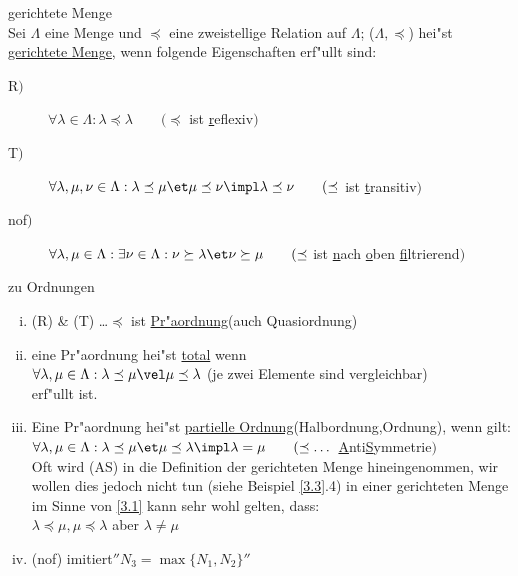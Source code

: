 \begin{definition}\label{3.1}gerichtete Menge\\
Sei $\Lambda$ eine Menge und $\preceq$ eine zweistellige Relation auf $\Lambda$; ($\Lambda ,\preceq $) hei"st \ul{gerichtete Menge}, wenn folgende Eigenschaften erf"ullt sind:
\begin{description}
\item[R$)$] $\forall\lambda\in\Lambda:\lambda\preceq\lambda\qquad(\preceq$ ist \ul{r}eflexiv$)$
\item[T$)$] $\forall \lambda ,\mu ,\nu\in\Lambda: \lambda\preceq\mu \et \mu\preceq\nu\impl \lambda\preceq\nu\qquad(\preceq $ ist \ul{t}ransitiv$)$
\item[nof$)$] $\forall \lambda ,\mu\in\Lambda: \exists\nu\in\Lambda: \nu\succeq\lambda \et \nu\succeq\mu\qquad (\preceq $ ist \ul{n}ach \ul{o}ben \ul{f}iltrierend$)$
\end{description}
\end{definition}

\begin{bem}\label{3.2}zu Ordnungen
\begin{enumerate}[(i)]
\item (R) \& (T) \dots $\preceq$ ist \ul{Pr"aordnung}(auch Quasiordnung)
\item eine Pr"aordnung hei"st \ul{total} wenn \\
\hspace*{3cm}{\bf (tot)}$\forall\lambda ,\mu\in\Lambda :\lambda\preceq\mu \vel\mu\preceq\lambda$ (je zwei Elemente sind vergleichbar)\\
erf"ullt ist.
\item Eine Pr"aordnung hei"st \ul{partielle Ordnung}(Halbordnung,Ordnung), wenn gilt:
\hspace*{1cm}{\bf (AS)}$\forall\lambda ,\mu\in\Lambda :\lambda\preceq\mu\et\mu\preceq\lambda\impl\lambda =\mu\qquad (\preceq\dots$ \ul{A}nti\ul{S}ymmetrie$)$\\
Oft wird (AS) in die Definition der gerichteten Menge hineingenommen, wir wollen dies jedoch nicht tun (siehe Beispiel \ref{3.3}.4) in einer gerichteten Menge im Sinne von \ref{3.1} kann sehr wohl gelten, dass:\\
\hspace*{3cm}$\lambda\preceq\mu ,\mu\preceq\lambda $ aber $\lambda\neq\mu$
\item (nof) imitiert$''N_3=\max\{N_1,N_2\}''$
\end{enumerate}
\end{bem}

